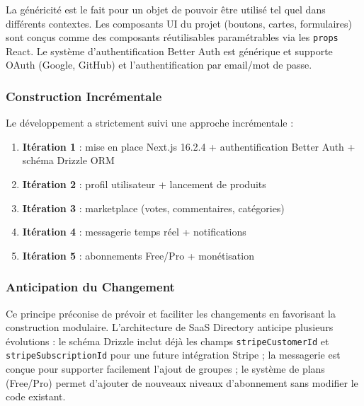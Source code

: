 La généricité est le fait pour un objet de pouvoir être utilisé tel quel dans différents contextes. Les composants UI du projet (boutons, cartes, formulaires) sont conçus comme des composants réutilisables paramétrables via les \texttt{props} React. Le système d'authentification Better Auth est générique et supporte OAuth (Google, GitHub) et l'authentification par email/mot de passe.



\subsubsection{Construction Incrémentale}



Le développement a strictement suivi une approche incrémentale :



\begin{enumerate}

\item \textbf{Itération 1} : mise en place Next.js 16.2.4 + authentification Better Auth + schéma Drizzle ORM

\item \textbf{Itération 2} : profil utilisateur + lancement de produits

\item \textbf{Itération 3} : marketplace (votes, commentaires, catégories)

\item \textbf{Itération 4} : messagerie temps réel + notifications

\item \textbf{Itération 5} : abonnements Free/Pro + monétisation

\end{enumerate}



\subsubsection{Anticipation du Changement}



Ce principe préconise de prévoir et faciliter les changements en favorisant la construction modulaire. L'architecture de SaaS Directory anticipe plusieurs évolutions : le schéma Drizzle inclut déjà les champs \texttt{stripeCustomerId} et \texttt{stripeSubscriptionId} pour une future intégration Stripe ; la messagerie est conçue pour supporter facilement l'ajout de groupes ; le système de plans (Free/Pro) permet d'ajouter de nouveaux niveaux d'abonnement sans modifier le code existant.



